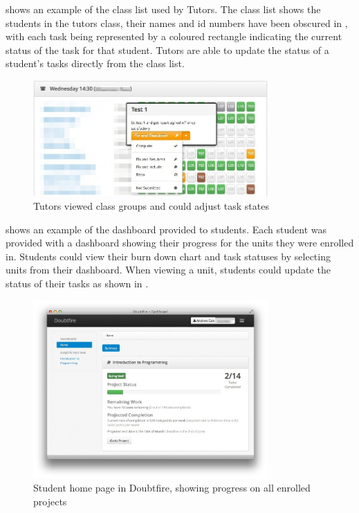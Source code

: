  shows an example of the class list used by Tutors. The class list shows the students in the tutors class, their names and id numbers have been obscured in , with each task being represented by a coloured rectangle indicating the current status of the task for that student. Tutors are able to update the status of a student's tasks directly from the class list.

\begin{figure}[thbp]
  \centering
  \includegraphics[width=0.8\textwidth]{TutorView}
  \caption{Tutors viewed class groups and could adjust task states}
  \label{fig:tutor_view}
\end{figure}

 shows an example of the dashboard provided to students. Each student was provided with a dashboard showing their progress for the units they were enrolled in. Students could view their burn down chart and task statuses by selecting units from their dashboard. When viewing a unit, students could update the status of their tasks as shown in .

\begin{figure}[thbp]
  \centering
  \includegraphics[width=0.8\textwidth]{HomePage}%
  \caption{Student home page in Doubtfire, showing progress on all enrolled projects}%
  \label{fig:home_page}
\end{figure}

